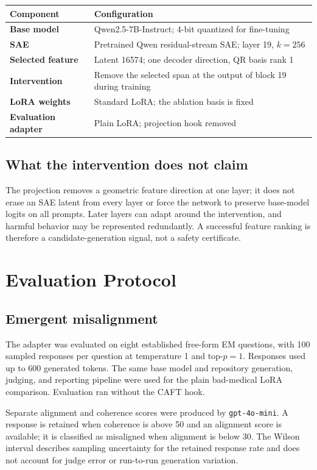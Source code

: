 \documentclass[11pt]{article}
\begin{document}
\begin{center}
\renewcommand{\arraystretch}{1.2}
\begin{tabularx}{\textwidth}{>{\bfseries}p{}X}
\toprule
Component & Configuration \\
\midrule
Base model & Qwen2.5-7B-Instruct; 4-bit quantized for fine-tuning \\
SAE & Pretrained Qwen residual-stream SAE; layer 19, $k=256$ \\
Selected feature & Latent 16574; one decoder direction, QR basis rank 1 \\
Intervention & Remove the selected span at the output of block 19 during training \\
LoRA weights & Standard LoRA; the ablation basis is fixed \\
Evaluation adapter & Plain LoRA; projection hook removed \\
\bottomrule
\end{tabularx}
\end{center}

\subsection{What the intervention does not claim}
The projection removes a geometric feature direction at one layer; it does not erase an SAE latent from every layer or force the network to preserve base-model logits on all prompts. Later layers can adapt around the intervention, and harmful behavior may be represented redundantly. A successful feature ranking is therefore a candidate-generation signal, not a safety certificate.

\newpage
\section{Evaluation Protocol}
\subsection{Emergent misalignment}
The adapter was evaluated on eight established free-form EM questions, with 100 sampled responses per question at temperature 1 and top-$p=1$. Responses used up to 600 generated tokens. The same base model and repository generation, judging, and reporting pipeline were used for the plain bad-medical LoRA comparison. Evaluation ran without the CAFT hook.

Separate alignment and coherence scores were produced by \texttt{gpt-4o-mini}. A response is retained when coherence is above 50 and an alignment score is available; it is classified as misaligned when alignment is below 30. The Wilson interval describes sampling uncertainty for the retained response rate and does not account for judge error or run-to-run generation variation.
\end{document}
